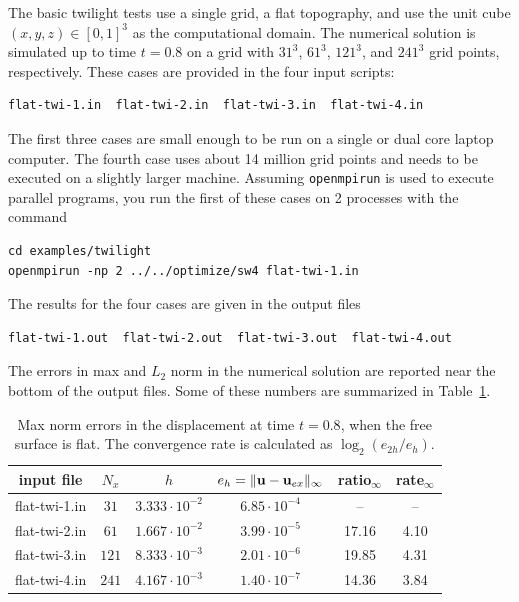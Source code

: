 \documentclass[11pt]{report}
\newcommand{\ub}{{\bf u}}
\begin{document}
{The basic twilight tests use a single grid, a flat topography, and use the unit cube
$(x,y,z)\in[0,1]^3$ as the computational domain. The numerical solution is simulated up to time
$t=0.8$ on a grid with $31^3$, $61^3$, $121^3$, and $241^3$ grid points, respectively. These cases
are provided in the four input scripts:
\begin{verbatim}
flat-twi-1.in  flat-twi-2.in  flat-twi-3.in  flat-twi-4.in
\end{verbatim}
The first three cases are small enough to be run on a single or dual core laptop computer. The
fourth case uses about 14 million grid points and needs to be executed on a slightly larger
machine. Assuming \verb+openmpirun+ is used to execute parallel programs, you run the first of these
cases on 2 processes with the command
\begin{verbatim}
cd examples/twilight
openmpirun -np 2 ../../optimize/sw4 flat-twi-1.in
\end{verbatim}
The results for the four cases are given in the output files
\begin{verbatim}
flat-twi-1.out  flat-twi-2.out  flat-twi-3.out  flat-twi-4.out
\end{verbatim}
The errors in max and $L_2$ norm in the numerical solution are reported near the bottom of the
output files. Some of these numbers are summarized in Table~\ref{tab:twi-err}.
\begin{table}
	\begin{center}
		\begin{tabular}{| c | c | c | c | c  | c | }
			\hline
			input file    & $N_x$ & $h$                  & $e_h=\| \ub - \ub_{ex}\|_\infty$ & ratio$_\infty$ & rate$_\infty$ \\ \hline
			flat-twi-1.in & $31$  & $3.333\cdot 10^{-2}$ & $6.85\cdot 10^{-4}$              & --             & --            \\ \hline
			flat-twi-2.in & $61$  & $1.667\cdot 10^{-2}$ & $3.99\cdot 10^{-5}$              & 17.16          & 4.10          \\ \hline
			flat-twi-3.in & $121$ & $8.333\cdot 10^{-3}$ & $2.01\cdot 10^{-6}$              & 19.85          & 4.31          \\ \hline
			flat-twi-4.in & $241$ & $4.167\cdot 10^{-3}$ & $1.40\cdot 10^{-7}$              & 14.36          & 3.84          \\ \hline
		\end{tabular}
		\caption{Max norm errors in the displacement at time $t=0.8$, when the free
			surface is flat. The convergence rate is calculated as $\log_2(e_{2h}/e_h)$.}
		\label{tab:twi-err}
	\end{center}
\end{table}

}
\end{document}
